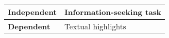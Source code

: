 \begin{table}[!h]
\centering    
\begin{threeparttable}
\begin{tabular}{l|l}



\hline

\textbf{Independent } & Information-seeking task \\
\hline
\textbf{Dependent} & Textual highlights  \\
\hline

\end{tabular}
\end{threeparttable}
\caption{}
\label{tbl:cp3-experiment-overview}
\end{table}

